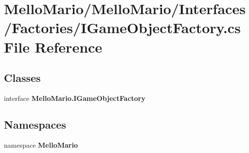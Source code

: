 \section{Mello\+Mario/\+Mello\+Mario/\+Interfaces/\+Factories/\+I\+Game\+Object\+Factory.cs File Reference}
\label{IGameObjectFactory_8cs}
\subsection*{Classes}
\begin{DoxyCompactItemize}
\item 
interface \textbf{ Mello\+Mario.\+I\+Game\+Object\+Factory}
\end{DoxyCompactItemize}
\subsection*{Namespaces}
\begin{DoxyCompactItemize}
\item 
namespace \textbf{ Mello\+Mario}
\end{DoxyCompactItemize}
